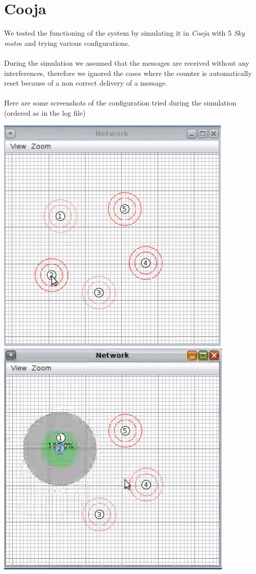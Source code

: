 \documentclass{article}
\begin{document}
\section{Cooja}
We tested the functioning of the system by simulating it in \textit{Cooja} with 5 \textit{Sky mote}s and trying various configurations.\\\\
During the simulation we assumed that the messages are received without any interferences, therefore we ignored the cases where the counter is automatically reset because of a non correct delivery of a message.
\\\\
Here are some screenshots of the configuration tried during the simulation (ordered as in the log file)
\\
\begin{center}
\includegraphics[scale=1]{img1.png}
\includegraphics[scale=1]{img2.png}

\end{center}
\end{document}
